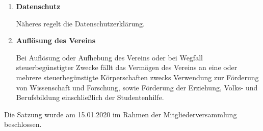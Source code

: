 \documentclass[german]{article}
\newcommand{\paragr}[1]{\item \textsf{\textbf{#1}}}
\begin{document}
\begin{enumerate}
\begin{enumerate}
\end{enumerate}


\paragr{Datenschutz}

Näheres regelt die Datenschutzerklärung.


\paragr{Auflösung des Vereins}

Bei Auflösung oder Aufhebung des Vereins oder bei Wegfall steuerbegünstigter Zwecke fällt das Vermögen des Vereins an eine oder mehrere steuerbegünstigte Körperschaften zwecks Verwendung zur Förderung von Wissenschaft und Forschung, sowie Förderung der Erziehung, Volks- und Berufsbildung einschließlich der Studentenhilfe.


\end{enumerate}
\vspace{2cm}
Die Satzung wurde am 15.01.2020 im Rahmen der Mitgliederversammlung beschlossen.
	
\end{document}
